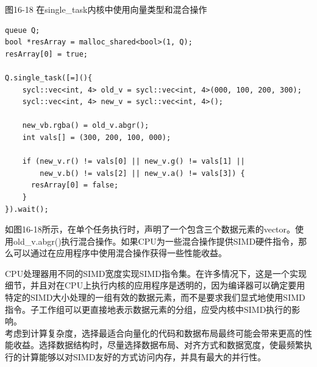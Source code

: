\hspace*{\fill} \par %
图16-18 在single\_task内核中使用向量类型和混合操作
\begin{lstlisting}[caption={}]
queue Q;
bool *resArray = malloc_shared<bool>(1, Q);
resArray[0] = true;

Q.single_task([=](){
	sycl::vec<int, 4> old_v = sycl::vec<int, 4>(000, 100, 200, 300);
	sycl::vec<int, 4> new_v = sycl::vec<int, 4>();
	
	new_vb.rgba() = old_v.abgr();
	int vals[] = (300, 200, 100, 000);
	
	if (new_v.r() != vals[0] || new_v.g() != vals[1] ||
	    new_v.b() != vals[2] || new_v.a() != vals[3]) {
      resArray[0] = false;    
    }
}).wait();
\end{lstlisting}

如图16-18所示，在单个任务执行时，声明了一个包含三个数据元素的vector。使用old\_v.abgr()执行混合操作。如果CPU为一些混合操作提供SIMD硬件指令，那么可以通过在应用程序中使用混合操作获得一些性能收益。\par

\begin{tcolorbox}[colback=blue!5!white,colframe=blue!75!black, title=SIMD VECTORIZATION GUIDELINES]
CPU处理器用不同的SIMD宽度实现SIMD指令集。在许多情况下，这是一个实现细节，并且对在CPU上执行内核的应用程序是透明的，因为编译器可以确定要用特定的SIMD大小处理的一组有效的数据元素，而不是要求我们显式地使用SIMD指令。子工作组可以更直接地表示数据元素的分组，应受内核中SIMD执行的影响。\\

考虑到计算复杂度，选择最适合向量化的代码和数据布局最终可能会带来更高的性能收益。选择数据结构时，尽量选择数据布局、对齐方式和数据宽度，使最频繁执行的计算能够以对SIMD友好的方式访问内存，并具有最大的并行性。
\end{tcolorbox}









